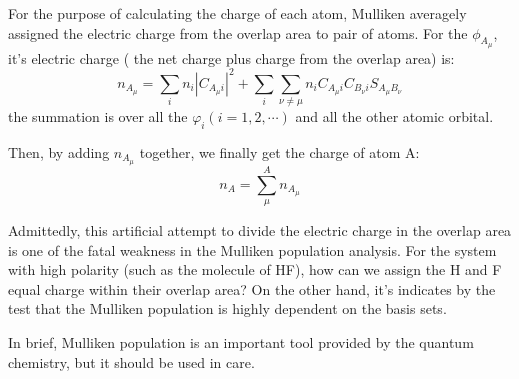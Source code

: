 For the purpose of calculating the charge of each atom, Mulliken
averagely assigned the electric charge from the overlap area to pair
of atoms. For the $\phi_{A_{\mu}}$, it's electric charge ( the net
charge plus charge from the overlap area) is:
\begin{equation}\label{}
n_{A_{\mu}} = \sum_{i}n_{i}\left| C_{A_{\mu}i} \right|^{2} +
\sum_{i}\sum_{\nu \neq \mu}n_{i}C_{A_{\mu}i}C_{B_{\nu}i}
S_{A_{\mu}B_{\nu}}
\end{equation}
the summation is over all the $\varphi_{i} (i=1,2, \cdots)$ and all
the other atomic orbital.

Then, by adding $n_{A_{\mu}}$ together, we finally get the charge of
atom A:
\begin{equation}\label{}
n_{A} = \sum^{A}_{\mu} n_{A_{\mu}}
\end{equation}

Admittedly, this artificial attempt to divide the electric charge in
the overlap area is one of the fatal weakness in the Mulliken
population analysis. For the system with high polarity (such as the
molecule of HF), how can we assign the H and F  equal charge within
their overlap area? On the other hand, it's indicates by the test
that the Mulliken population is highly dependent on the basis sets.

In brief, Mulliken population is an important tool provided by the
quantum chemistry, but it should be used in care.



